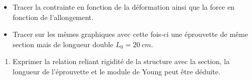\documentclass[
]{article}
\providecommand{\tightlist}{%
  \setlength{\itemsep}{0pt}\setlength{\parskip}{0pt}}\usepackage{longtable,booktabs,array}
\begin{document}
\begin{itemize}
\tightlist
\item
  Tracer la contrainte en fonction de la déformation ainsi que la force
  en fonction de l'allongement.
\item
  Tracer sur les mêmes graphiques avec cette fois-ci une éprouvette de
  même section mais de longueur double \(L_{0}= 20~cm\).
\end{itemize}

\begin{enumerate}
\def\labelenumi{\arabic{enumi}.}
\setcounter{enumi}{3}
\tightlist
\item
  Exprimer la relation reliant rigidité de la structure avec la section,
  la longueur de l'éprouvette et le module de Young peut être déduite.
\end{enumerate}
\end{document}
